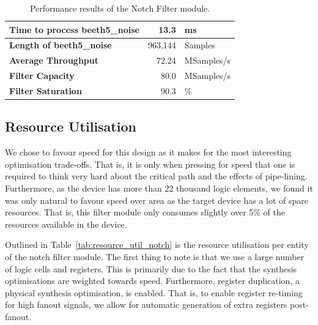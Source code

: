 \documentclass[]{article}
\begin{document}
\begin{table}[htbp]
	\caption{Performance results of the Notch Filter module.}
	\label{tab:notch_performance_results}
	\begin{center}
		\begin{tabular}{l|rl}
		\hline

		\hline
			\textbf{Time to process beeth5\_noise}	& 13.3 		& ms \\
		\hline
			\textbf{Length of beeth5\_noise}		& 963,144 	& Samples \\
		\hline
			\textbf{Average Throughput}				& 72.24 	& MSamples/s \\
		\hline
			\textbf{Filter Capacity}				& 80.0 		& MSamples/s \\
		\hline
			\textbf{Filter Saturation}				& 90.3 		& \% \\
		\hline

		\hline
		\end{tabular}
	\end{center}
\end{table}



\subsection{Resource Utilisation} %
\label{sub:resource_utilisation}

We chose to favour speed for this design as it makes for the most interesting optimisation trade-offs. That is, it is only when pressing for speed that one is required to think very hard about the critical path and the effects of pipe-lining.
Furthermore, as the device has more than 22 thousand logic elements, we found it was only natural to favour speed over area as the target device has a lot of spare resources.
That is, this filter module only consumes slightly over 5\% of the resources available in the device.

Outlined in Table~\ref{tab:resource_util_notch} is the resource utilisation per entity of the notch filter module.
The first thing to note is that we use a large number of logic cells and registers. This is primarily due to the fact that the synthesis optimisations are weighted towards speed.
Furthermore, register duplication, a physical synthesis optimisation, is enabled. That is, to enable register re-timing for high fanout signals, we allow for automatic generation of extra registers post-fanout.
\end{document}
